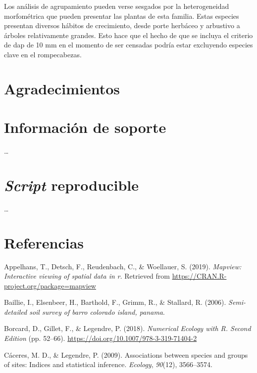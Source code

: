 \documentclass[11pt,]{article}
\begin{document}
Los análisis de agrupamiento pueden verse sesgados por la heterogeneidad
morfométrica que pueden presentar las plantas de esta familia. Estas
especies presentan diversos hábitos de crecimiento, desde porte herbáceo
y arbustivo a árboles relativamente grandes. Esto hace que el hecho de
que se incluya el criterio de dap de 10 mm en el momento de ser censadas
podría estar excluyendo especies clave en el rompecabezas.

\section{Agradecimientos}\label{agradecimientos}

\section{Información de soporte}\label{informaciuxf3n-de-soporte}

\ldots

\section{\texorpdfstring{\emph{Script}
reproducible}{Script reproducible}}\label{script-reproducible}

\ldots

\section*{Referencias}\label{referencias}

\hypertarget{refs}{}
\hypertarget{ref-cita_mapview}{}
Appelhans, T., Detsch, F., Reudenbach, C., \& Woellauer, S. (2019).
\emph{Mapview: Interactive viewing of spatial data in r}. Retrieved from
\url{https://CRAN.R-project.org/package=mapview}

\hypertarget{ref-baillie_soil}{}
Baillie, I., Elsenbeer, H., Barthold, F., Grimm, R., \& Stallard, R.
(2006). \emph{Semi-detailed soil survey of barro colorado island,
panama}.

\hypertarget{ref-borcard_legendre}{}
Borcard, D., Gillet, F., \& Legendre, P. (2018). \emph{Numerical Ecology
with R. Second Edition} (pp. 52--66).
\url{https://doi.org/10.1007/978-3-319-71404-2}

\hypertarget{ref-caceres2009associations}{}
Cáceres, M. D., \& Legendre, P. (2009). Associations between species and
groups of sites: Indices and statistical inference. \emph{Ecology},
\emph{90}(12), 3566--3574.
\end{document}
